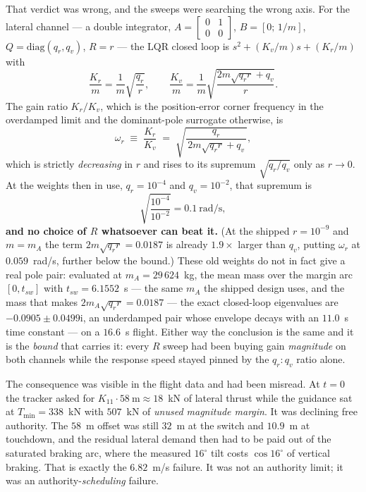 \documentclass[11pt]{article}
\newcommand{\Tmin}{T_{\min}}
\begin{document}
That verdict was wrong, and the sweeps were searching the wrong axis. For
the lateral channel --- a double integrator, $A = \left[\begin{smallmatrix}0
& 1\\ 0 & 0\end{smallmatrix}\right]$, $B = [0;\,1/m]$, $Q =
\mathrm{diag}(q_r, q_v)$, $R = r$ --- the LQR closed loop is
$s^2 + (K_v/m)s + (K_r/m)$ with
%
\begin{equation}
\frac{K_r}{m} = \frac{1}{m}\sqrt{\frac{q_r}{r}},
\qquad
\frac{K_v}{m} = \frac{1}{m}\sqrt{\frac{2m\sqrt{q_r r} + q_v}{r}} .
\label{eq:aregains}
\end{equation}
%
The gain ratio $K_r/K_v$, which is the position-error corner frequency in
the overdamped limit and the dominant-pole surrogate otherwise, is
%
\begin{equation}
\omega_{r} \;\equiv\; \frac{K_r}{K_v} \;=\;
\sqrt{\frac{q_r}{\,2m\sqrt{q_r r} + q_v\,}} ,
\label{eq:pole}
\end{equation}
%
which is strictly \emph{decreasing} in $r$ and rises to its supremum
$\sqrt{q_r/q_v}$ only as $r \to 0$. At the weights then in use,
$q_r = 10^{-4}$ and $q_v = 10^{-2}$, that supremum is
%
\begin{equation}
\sqrt{\frac{10^{-4}}{10^{-2}}} = 0.1~\text{rad/s},
\end{equation}
%
\textbf{and no choice of $R$ whatsoever can beat it.} (At the shipped
$r = 10^{-9}$ and $m = m_A$ the term $2m\sqrt{q_r r} = 0.0187$ is already
$1.9\times$ larger than $q_v$, putting $\omega_r$ at $0.059$~rad/s, further
below the bound.) These old weights do not in fact give a real pole pair:
evaluated at $m_A = 29\,624$~kg, the mean mass over the margin arc
$[0, t_{sw}]$ with $t_{sw} = 6.1552$~s --- the same $m_A$ the shipped
design uses, and the mass that makes $2m_A\sqrt{q_r r} = 0.0187$ --- the
exact closed-loop eigenvalues are
$-0.0905 \pm 0.0499\mathrm{i}$, an underdamped pair whose envelope decays
with an $11.0$~s time constant --- on a $16.6$~s flight. Either way the
conclusion is the same and it is the \emph{bound} that carries it: every
$R$ sweep had been buying gain \emph{magnitude} on both channels while the
response speed stayed pinned by the $q_r{:}q_v$ ratio alone.

The consequence was visible in the flight data and had been misread. At
$t = 0$ the tracker asked for $K_{11}\cdot 58~\text{m} \approx 18$~kN of
lateral thrust while the guidance sat at $\Tmin = 338$~kN with $507$~kN of
\emph{unused magnitude margin}. It was declining free authority. The $58$~m
offset was still $32$~m at the switch and $10.9$~m at touchdown, and the
residual lateral demand then had to be paid out of the saturated braking
arc, where the measured $16^\circ$ tilt costs $\cos 16^\circ$ of vertical
braking. That is exactly the $6.82$~m/s failure. It was not an authority
limit; it was an authority-\emph{scheduling} failure.
\end{document}
